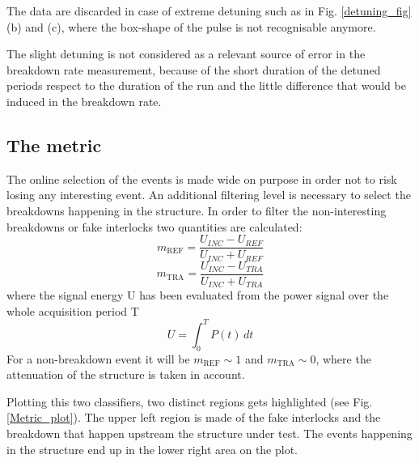 The data are discarded in case of extreme detuning such as in Fig. \ref{detuning_fig} (b) and (c), where the box-shape of the pulse is not recognisable anymore.

The slight detuning is not considered as a relevant source of error in the breakdown rate measurement,  because of the short duration of the detuned periods respect to the duration of the run and the little difference that would be induced in the breakdown rate.



\subsection[The metric]{The metric}

The online selection of the events is made wide on purpose in order not to risk losing any interesting event. An additional filtering level is necessary to select the breakdowns happening in the structure. In order to filter the non-interesting breakdowns or fake interlocks two quantities are calculated:
\begin{equation}
m_{\text{REF}}  =  \frac{ U_{INC} -  U_{REF}   }{  U_{INC} + U_{REF}   }
\end{equation}
\begin{equation}
m_{\text{TRA}}  =  \frac{ U_{INC} -  U_{TRA}   }{  U_{INC} +  U_{TRA}   }
\end{equation}
where the signal energy U has been evaluated from the power signal over the whole acquisition period T
\begin{equation}
U = \int_0^T P(t) \, dt
\end{equation}
For a non-breakdown event it will be $m_{\text{REF}} \sim 1$ and $m_{\text{TRA}} \sim 0$, where the attenuation of the structure is taken in account.

Plotting this two classifiers, two distinct regions gets highlighted (see Fig. \ref{Metric_plot}). The upper left region is made of the fake interlocks and the breakdown that happen upstream the structure under test. The events happening in the structure end up in the lower right area on the plot. 

